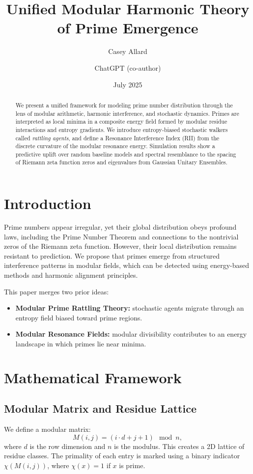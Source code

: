 \documentclass[12pt]{article}
\title{Unified Modular Harmonic Theory of Prime Emergence}
\author{Casey Allard \and ChatGPT (co-author)}
\date{July 2025}
\begin{document}
\maketitle

\begin{abstract}
We present a unified framework for modeling prime number distribution through the lens of modular arithmetic, harmonic interference, and stochastic dynamics. Primes are interpreted as local minima in a composite energy field formed by modular residue interactions and entropy gradients. We introduce entropy-biased stochastic walkers called \textit{rattling agents}, and define a Resonance Interference Index (RII) from the discrete curvature of the modular resonance energy. Simulation results show a predictive uplift over random baseline models and spectral resemblance to the spacing of Riemann zeta function zeros and eigenvalues from Gaussian Unitary Ensembles.
\end{abstract}

\section{Introduction}
Prime numbers appear irregular, yet their global distribution obeys profound laws, including the Prime Number Theorem and connections to the nontrivial zeros of the Riemann zeta function. However, their local distribution remains resistant to prediction. We propose that primes emerge from structured interference patterns in modular fields, which can be detected using energy-based methods and harmonic alignment principles.

This paper merges two prior ideas:
\begin{itemize}
\item \textbf{Modular Prime Rattling Theory:} stochastic agents migrate through an entropy field biased toward prime regions.
\item \textbf{Modular Resonance Fields:} modular divisibility contributes to an energy landscape in which primes lie near minima.
\end{itemize}

\section{Mathematical Framework}

\subsection{Modular Matrix and Residue Lattice}
We define a modular matrix:
\[
M(i, j) = (i \cdot d + j + 1) \mod n,
\]
where \(d\) is the row dimension and \(n\) is the modulus. This creates a 2D lattice of residue classes. The primality of each entry is marked using a binary indicator \(\chi(M(i,j))\), where \(\chi(x) = 1\) if \(x\) is prime.
\end{document}
